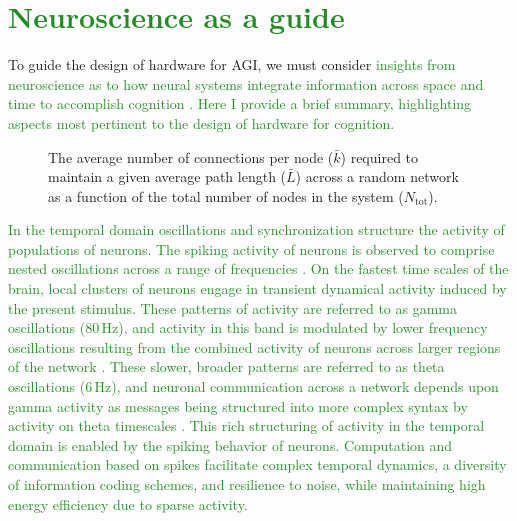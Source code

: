\documentclass[twocolumn]{article}
\begin{document}
\section{\label{sec:neuroscience}\textcolor{ForestGreen}{Neuroscience as a guide}}
To guide the design of hardware for AGI, we must consider \textcolor{ForestGreen}{insights from neuroscience as to how neural systems integrate information across space and time to accomplish cognition \cite{bu2006,sp2010,beba2017,khma2018}. Here I provide a brief summary, highlighting aspects most pertinent to the design of hardware for cognition.} 

\begin{figure}[t]
	\caption{\label{fig:path_length}The average number of connections per node ($\bar{k}$) required to maintain a given average path length ($\bar{L}$)  across a random network as a function of the total number of nodes in the system ($N_{\mathrm{tot}}$).}
\end{figure}
\textcolor{ForestGreen}{In the temporal domain oscillations and synchronization \cite{bu2006} structure the activity of populations of neurons. The spiking activity of neurons is observed to comprise nested oscillations across a range of frequencies \cite{budr2004}. On the fastest time scales of the brain, local clusters of neurons engage in transient dynamical activity induced by the present stimulus. These patterns of activity are referred to as gamma oscillations (80\,Hz), and activity in this band is modulated by lower frequency oscillations \cite{caed2006,jeco2007} resulting from the combined activity of neurons across larger regions of the network \cite{stsa2000}. These slower, broader patterns are referred to as theta oscillations (6\,Hz), and neuronal communication across a network depends upon gamma activity as messages being structured into more complex syntax by activity on theta timescales \cite{fr2015,bu2019}. This rich structuring of activity in the temporal domain is enabled by the spiking behavior of neurons. Computation and communication based on spikes facilitate complex temporal dynamics, a diversity of information coding schemes, and resilience to noise, while maintaining high energy efficiency due to sparse activity.}
\end{document}
